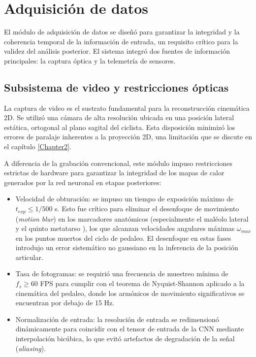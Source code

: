\section{Adquisición de datos}
\label{sec:adquisicion}

El módulo de adquisición de datos se diseñó para garantizar la integridad y la
coherencia temporal de la información de entrada, un requisito crítico para la
validez del análisis posterior. El sistema integró dos fuentes de información
principales: la captura óptica y la telemetría de sensores.

\subsection{Subsistema de video y restricciones ópticas}
La captura de video es el sustrato fundamental para la reconstrucción
cinemática 2D. Se utilizó una cámara de alta resolución ubicada en una posición
lateral estática, ortogonal al plano sagital del ciclista. Esta disposición
minimizó los errores de paralaje inherentes a la proyección 2D, una limitación
que se discute en el capítulo \ref{Chapter2}.

A diferencia de la grabación convencional, este módulo impuso restricciones
estrictas de hardware para garantizar la integridad de los mapas de calor
generados por la red neuronal en etapas posteriores:

\begin{itemize}
  \item Velocidad de obturación: se impuso un tiempo de exposición máximo de $t_{exp}
          \leq 1/500$ s. Esto fue crítico para eliminar el desenfoque de movimiento
        (\textit{motion blur}) en los marcadores anatómicos (especialmente el maléolo
        lateral \citep{Radiologia2013} y el quinto metatarso \citep{Wikipedia5Meta}),
        los que alcanzan velocidades angulares máximas $\omega_{max}$ en los puntos
        muertos del ciclo de pedaleo. El desenfoque en estas fases introdujo un error
        sistemático no gaussiano en la inferencia de la posición articular.
  \item Tasa de fotogramas: se requirió una frecuencia de muestreo mínima de $f_s \geq
          60$ FPS para cumplir con el teorema de Nyquist-Shannon \citep{Nyquist1928}
        aplicado a la cinemática del pedaleo, donde los armónicos de movimiento
        significativos se encuentran por debajo de 15 Hz.
  \item Normalización de entrada: la resolución de entrada se redimensionó
        dinámicamente para coincidir con el tensor de entrada de la CNN mediante
        interpolación bicúbica, lo que evitó artefactos de degradación de la señal
        (\textit{aliasing}).
\end{itemize}

